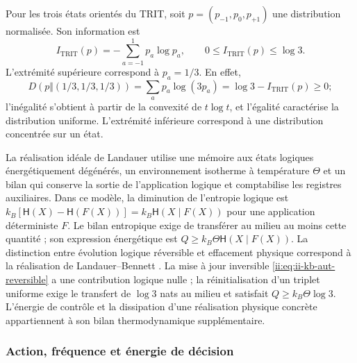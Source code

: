 Pour les trois états orientés du TRIT, soit
\(p=(p_{-1},p_0,p_{+1})\) une distribution normalisée. Son information est
\begin{equation}
 I_{\mathrm{TRIT}}(p)=-\sum_{a=-1}^{1}p_a\log p_a,
 \qquad 0\leq I_{\mathrm{TRIT}}(p)\leq\log3.
 \label{ii:eq:ii-kb-aut-trit}
\end{equation}
L'extrémité supérieure correspond à \(p_a=1/3\). En effet,
\[
 D(p\Vert(1/3,1/3,1/3))
 =\sum_ap_a\log(3p_a)=\log3-I_{\mathrm{TRIT}}(p)\geq0;
\]
l'inégalité s'obtient à partir de la convexité de \(t\log t\), et l'égalité caractérise la distribution uniforme. L'extrémité inférieure correspond à une distribution concentrée sur un état.

La réalisation idéale de Landauer utilise une mémoire aux états logiques
énergétiquement dégénérés, un environnement isotherme à température \(\Theta\)
et un bilan qui conserve la sortie de l'application logique et comptabilise les
registres auxiliaires. Dans ce modèle, la diminution de l'entropie logique est
\(k_B[\mathsf H(X)-\mathsf H(F(X))]
=k_B\mathsf H(X\mid F(X))\) pour une application déterministe \(F\).
Le bilan entropique exige de transférer au milieu au moins cette quantité ;
son expression énergétique est \(Q\geq k_B\Theta\mathsf H(X\mid F(X))\).
La distinction entre évolution logique réversible et effacement physique
correspond à la réalisation de Landauer--Bennett \cite{ii:bennett2003}.
La mise à jour inversible
\eqref{ii:eq:ii-kb-aut-reversible} a une contribution logique nulle ; la
réinitialisation d'un triplet uniforme exige le transfert de \(\log3\) nats
au milieu et satisfait \(Q\geq k_B\Theta\log3\).
L'énergie de contrôle et la dissipation d'une réalisation physique
concrète appartiennent à son bilan thermodynamique supplémentaire.

\subsubsection{Action, fréquence et énergie de décision}

